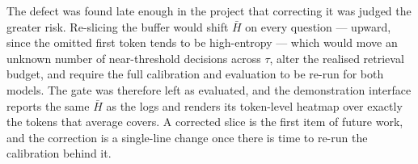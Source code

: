 The defect was found late enough in the project that correcting it was judged
the greater risk. Re-slicing the buffer would shift $\bar{H}$ on every question
--- upward, since the omitted first token tends to be high-entropy --- which
would move an unknown number of near-threshold decisions across $\tau$, alter
the realised retrieval budget, and require the full calibration and evaluation
to be re-run for both models. The gate was therefore left as evaluated, and the
demonstration interface reports the same $\bar{H}$ as the logs and renders its
token-level heatmap over exactly the tokens that average covers. A corrected
slice is the first item of future work, and the correction is a single-line
change once there is time to re-run the calibration behind it.
